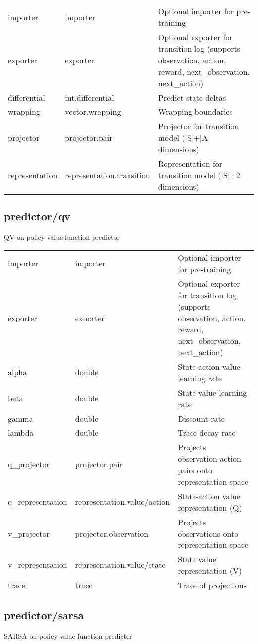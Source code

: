 \noindent\begin{tabular}{@{}lll@{}}
importer&importer&Optional importer for pre-training\\
exporter&exporter&Optional exporter for transition log (supports observation, action, reward, next\_observation, next\_action)\\
differential&int.differential&Predict state deltas\\
wrapping&vector.wrapping&Wrapping boundaries\\
projector&projector.pair&Projector for transition model (|S|+|A| dimensions)\\
representation&representation.transition&Representation for transition model (|S|+2 dimensions)\\
\end{tabular}
\subsection{predictor/qv}
\noindent QV on-policy value function predictor\\

\noindent\begin{tabular}{@{}lll@{}}
importer&importer&Optional importer for pre-training\\
exporter&exporter&Optional exporter for transition log (supports observation, action, reward, next\_observation, next\_action)\\
alpha&double&State-action value learning rate\\
beta&double&State value learning rate\\
gamma&double&Discount rate\\
lambda&double&Trace decay rate\\
q\_projector&projector.pair&Projects observation-action pairs onto representation space\\
q\_representation&representation.value/action&State-action value representation (Q)\\
v\_projector&projector.observation&Projects observations onto representation space\\
v\_representation&representation.value/state&State value representation (V)\\
trace&trace&Trace of projections\\
\end{tabular}
\subsection{predictor/sarsa}
\noindent SARSA on-policy value function predictor\\

